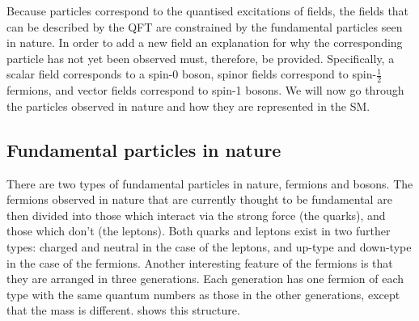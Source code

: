 Because particles correspond to the quantised excitations of fields, the fields that can be described by the QFT are constrained by the fundamental particles seen in nature. In order to add a new field an explanation for why the corresponding particle has not yet been observed must, therefore, be provided. Specifically, a scalar field corresponds to a spin-0 boson, spinor fields correspond to spin-$\frac{1}{2}$ fermions, and vector fields correspond to spin-1 bosons. We will now go through the particles observed in nature and how they are represented in the SM.

\subsection{Fundamental particles in nature}
There are two types of fundamental particles in nature, fermions and bosons. The fermions observed in nature that are currently thought to be fundamental are then divided into those which interact via the strong force (the quarks), and those which don't (the leptons). Both quarks and leptons exist in two further types: charged and neutral in the case of the leptons, and up-type and down-type in the case of the fermions. Another interesting feature of the fermions is that they are arranged in three generations. Each generation has one fermion of each type with the same quantum numbers as those in the other generations, except that the mass is different.  shows this structure.

